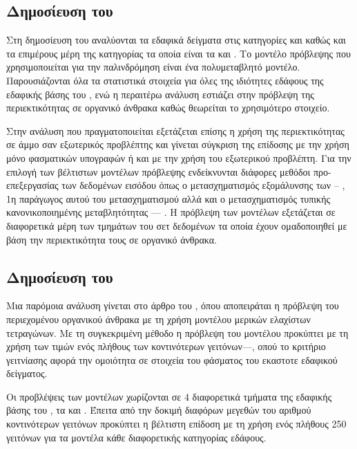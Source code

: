 \subsection{Δημοσίευση του }
Στη δημοσίευση του  \cite{stevens_lucas_soil} αναλύονται τα εδαφικά δείγματα στις κατηγορίες  και  καθώς και τα επιμέρους μέρη της κατηγορίας  τα οποία είναι τα  και . Το μοντέλο πρόβλεψης που χρησιμοποιείται για την παλινδρόμηση είναι ένα πολυμεταβλητό μοντέλο. Παρουσιάζονται όλα τα στατιστικά στοιχεία για όλες της ιδιότητες εδάφους της εδαφικής βάσης του , ενώ η περαιτέρω ανάλυση εστιάζει στην πρόβλεψη της περιεκτικότητας σε οργανικό άνθρακα καθώς θεωρείται το χρησιμότερο στοιχείο.

Στην ανάλυση που πραγματοποιείται εξετάζεται επίσης η χρήση της περιεκτικότητας σε άμμο σαν εξωτερικός προβλέπτης και γίνεται σύγκριση της επίδοσης με την χρήση μόνο φασματικών υπογραφών ή και με την χρήση του εξωτερικού προβλέπτη. Για την επιλογή των βέλτιστων μοντέλων πρόβλεψης ενδείκνυνται διάφορες μεθόδοι προ-επεξεργασίας των δεδομένων εισόδου όπως ο μετασχηματισμός εξομάλυνσης των -- \cite{savitzky_golay}, 1η παράγωγος αυτού του μετασχηματισμού αλλά και ο μετασχηματισμός τυπικής κανονικοποιημένης μεταβλητότητας --- . Η πρόβλεψη των μοντέλων εξετάζεται σε διαφορετικά μέρη των τμημάτων του σετ δεδομένων τα οποία έχουν ομαδοποιηθεί με βάση την περιεκτικότητα τους σε οργανικό άνθρακα.

\subsection{Δημοσίευση του }
Μια παρόμοια ανάλυση γίνεται στο άρθρο του  \cite{nocita_lucas_soil}, όπου αποπειράται η πρόβλεψη του περιεχομένου οργανικού άνθρακα με τη χρήση μοντέλου μερικών ελαχίστων τετραγώνων. Με τη συγκεκριμένη μέθοδο η πρόβλεψη του μοντέλου προκύπτει με τη χρήση των τιμών ενός πλήθους των κοντινότερων γειτόνων---, οπού το κριτήριο γειτνίασης αφορά την ομοιότητα σε στοιχεία του φάσματος του εκαστοτε εδαφικού δείγματος.

Οι προβλέψεις των μοντέλων χωρίζονται σε 4 διαφορετικά τμήματα της εδαφικής βάσης του , τα  και . Έπειτα από την δοκιμή διαφόρων μεγεθών του αριθμού κοντινότερων γειτόνων προκύπτει η βέλτιστη επίδοση με τη χρήση ενός πλήθους 250 γειτόνων για τα μοντέλα κάθε διαφορετικής κατηγορίας εδάφους.

